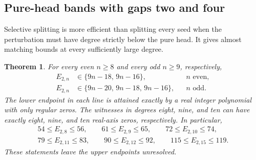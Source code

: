 \documentclass[UTF8,11pt]{ctexart}
\newtheorem{thm}{Theorem}[section]
\theoremstyle{definition}
\numberwithin{equation}{section}
\begin{document}
\subsection{Pure-head bands with gaps two and four}
\label{v41:sec:purebands}

Selective splitting is more efficient than splitting every seed
when the perturbation must have degree strictly below the pure head.
It gives almost matching bounds at every sufficiently large degree.

\begin{thm}\label{v41:thm:purebands}
For every even $n\ge8$ and every odd $n\ge9$, respectively,
\begin{align}
 E_{2,n}&\in\{9n-18,\,9n-16\},
                  &&n\text{ even},\label{v41:eq:evenpure}\\
 E_{2,n}&\in\{9n-20,\,9n-18,\,9n-16\},
                  &&n\text{ odd}.\label{v41:eq:oddpure}
\end{align}
The lower endpoint in each line is attained exactly by a
real integer polynomial with only regular zeros. The witnesses
in degrees eight, nine, and ten can have exactly eight, nine,
and ten real-axis zeros, respectively. In particular,
\begin{equation}\label{v41:eq:examples}
 \begin{gathered}
 54\le E_{2,8}\le56,\qquad61\le E_{2,9}\le65,\qquad
 72\le E_{2,10}\le74,\\
 79\le E_{2,11}\le83,\qquad90\le E_{2,12}\le92,\qquad
 115\le E_{2,15}\le119.
 \end{gathered}
\end{equation}
These statements leave the upper endpoints unresolved.
\end{thm}
\end{document}
